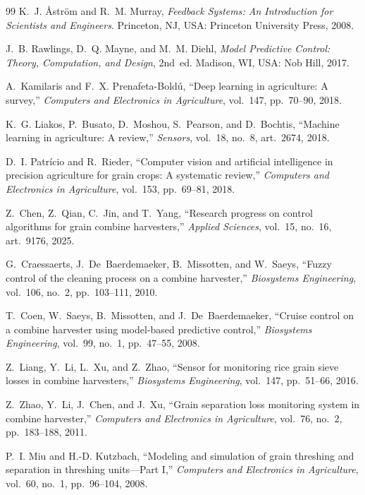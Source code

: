 \begin{thebibliography}{99}
K.~J. {\AA}str\"om and R.~M. Murray,
\emph{Feedback Systems: An Introduction for Scientists and Engineers}.
Princeton, NJ, USA: Princeton University Press, 2008.

J.~B. Rawlings, D.~Q. Mayne, and M.~M. Diehl,
\emph{Model Predictive Control: Theory, Computation, and Design}, 2nd~ed.
Madison, WI, USA: Nob Hill, 2017.

A.~Kamilaris and F.~X. Prenafeta-Bold\'u,
``Deep learning in agriculture: A survey,''
\emph{Computers and Electronics in Agriculture}, vol.~147, pp.~70--90, 2018.

K.~G. Liakos, P.~Busato, D.~Moshou, S.~Pearson, and D.~Bochtis,
``Machine learning in agriculture: A review,''
\emph{Sensors}, vol.~18, no.~8, art.~2674, 2018.

D.~I. Patr\'icio and R.~Rieder,
``Computer vision and artificial intelligence in precision agriculture for grain crops: A systematic review,''
\emph{Computers and Electronics in Agriculture}, vol.~153, pp.~69--81, 2018.

Z.~Chen, Z.~Qian, C.~Jin, and T.~Yang,
``Research progress on control algorithms for grain combine harvesters,''
\emph{Applied Sciences}, vol.~15, no.~16, art.~9176, 2025.

G.~Craessaerts, J.~De~Baerdemaeker, B.~Missotten, and W.~Saeys,
``Fuzzy control of the cleaning process on a combine harvester,''
\emph{Biosystems Engineering}, vol.~106, no.~2, pp.~103--111, 2010.

T.~Coen, W.~Saeys, B.~Missotten, and J.~De~Baerdemaeker,
``Cruise control on a combine harvester using model-based predictive control,''
\emph{Biosystems Engineering}, vol.~99, no.~1, pp.~47--55, 2008.

Z.~Liang, Y.~Li, L.~Xu, and Z.~Zhao,
``Sensor for monitoring rice grain sieve losses in combine harvesters,''
\emph{Biosystems Engineering}, vol.~147, pp.~51--66, 2016.

Z.~Zhao, Y.~Li, J.~Chen, and J.~Xu,
``Grain separation loss monitoring system in combine harvester,''
\emph{Computers and Electronics in Agriculture}, vol.~76, no.~2, pp.~183--188, 2011.

P.~I. Miu and H.-D. Kutzbach,
``Modeling and simulation of grain threshing and separation in threshing units---Part I,''
\emph{Computers and Electronics in Agriculture}, vol.~60, no.~1, pp.~96--104, 2008.


\end{thebibliography}
